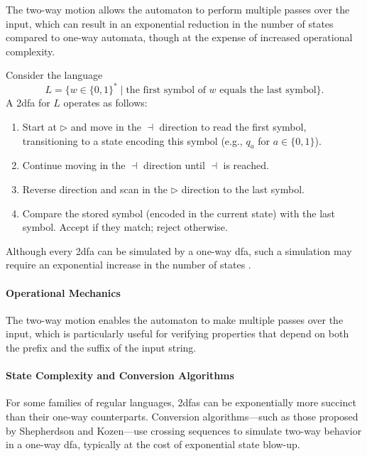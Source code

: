 \begin{remark}
The two-way motion allows the automaton to perform multiple passes over the input, which can result in an exponential reduction in the number of states compared to one-way automata, though at the expense of increased operational complexity.
\end{remark}

\begin{example}
    Consider the language 
    \[
    L = \{ w\in \{0,1\}^* \mid \text{the first symbol of } w \text{ equals the last symbol} \}.
    \]
    A \gls{2dfa} for \(L\) operates as follows:
    \begin{enumerate}
      \item Start at \(\triangleright\) and move in the \(\dashv\) direction to read the first symbol, transitioning to a state encoding this symbol (e.g., \(q_a\) for \(a \in \{0,1\}\)).
      \item Continue moving in the \(\dashv\) direction until \(\dashv\) is reached.
      \item Reverse direction and scan in the \(\triangleright\) direction to the last symbol.
      \item Compare the stored symbol (encoded in the current state) with the last symbol. Accept if they match; reject otherwise.
    \end{enumerate}
\end{example}

\begin{observation}
    Although every \gls{2dfa} can be simulated by a one-way \gls{dfa}, such a simulation may require an exponential increase in the number of states \cite{shepherdson1959reduction}.
\end{observation}

\paragraph{Operational Mechanics}
The two-way motion enables the automaton to make multiple passes over the input, which is particularly useful for verifying properties that depend on both the prefix and the suffix of the input string.

\paragraph{State Complexity and Conversion Algorithms}
For some families of regular languages, \glspl{2dfa} can be exponentially more succinct than their one-way counterparts. Conversion algorithms—such as those proposed by Shepherdson and Kozen—use crossing sequences to simulate two-way behavior in a one-way \gls{dfa}, typically at the cost of exponential state blow-up.

